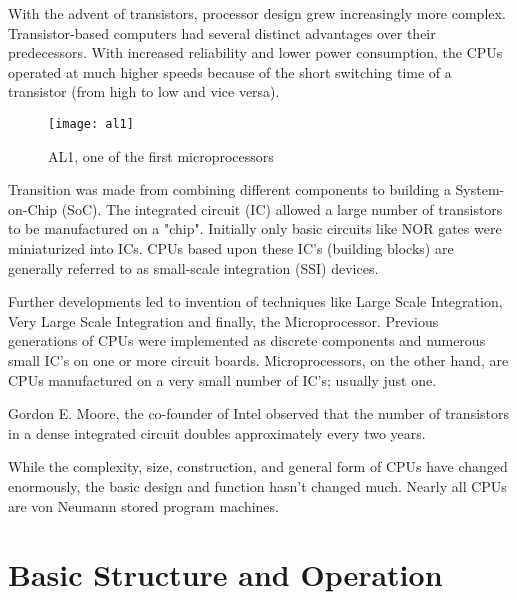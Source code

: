 With the advent of transistors, processor design grew increasingly more complex. Transistor-based computers had several distinct advantages over their predecessors. With increased reliability and lower power consumption, the CPUs operated at much higher speeds because of the short switching time of a transistor (from high to low and vice versa). 

\begin{wrapfigure}{l}{0.4\textwidth}
\caption{AL1, one of the first microprocessors}
\label{fig:edvac}
\centering
\texttt{[image: al1]}
\end{wrapfigure}

Transition was made from combining different components to building a System-on-Chip (SoC).  The integrated circuit (IC) allowed a large number of transistors to be manufactured on a "chip". Initially only basic circuits like NOR gates were miniaturized into ICs. CPUs based upon these IC's (building blocks) are generally referred to as small-scale integration (SSI) devices.

Further developments led to invention of techniques like Large Scale Integration, Very Large Scale Integration and finally, the Microprocessor. Previous generations of CPUs were implemented as discrete components and numerous small IC's on one or more circuit boards. Microprocessors, on the other hand, are CPUs manufactured on a very small number of IC's; usually just one.

\begin{remark}
Gordon E. Moore, the co-founder of Intel observed that the number of transistors in a dense integrated circuit doubles approximately every two years.
\end{remark}

While the complexity, size, construction, and general form of CPUs have changed enormously, the basic design and function hasn't changed much. Nearly all CPUs are von Neumann stored program machines.


\section{Basic Structure and Operation}

